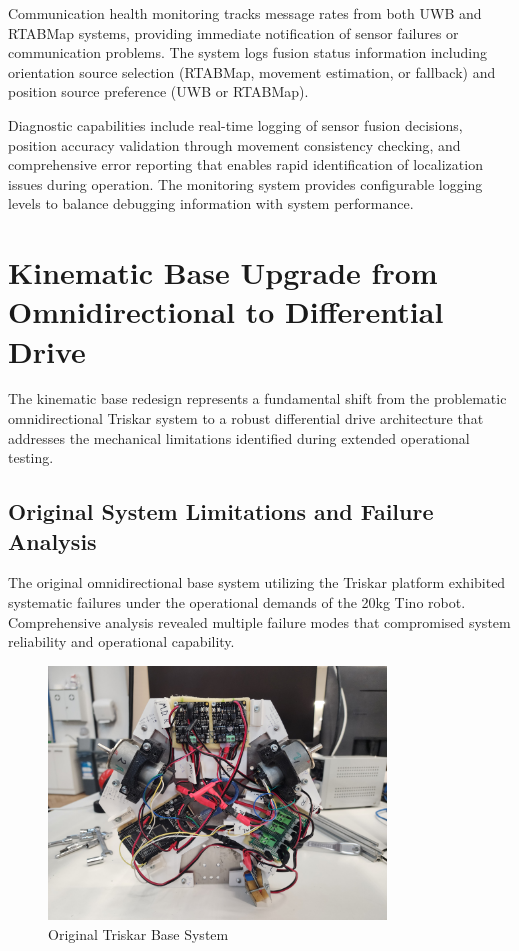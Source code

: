 Communication health monitoring tracks message rates from both UWB and RTABMap systems, providing immediate notification of sensor failures or communication problems. The system logs fusion status information including orientation source selection (RTABMap, movement estimation, or fallback) and position source preference (UWB or RTABMap).

Diagnostic capabilities include real-time logging of sensor fusion decisions, position accuracy validation through movement consistency checking, and comprehensive error reporting that enables rapid identification of localization issues during operation. The monitoring system provides configurable logging levels to balance debugging information with system performance.


\section{Kinematic Base Upgrade from Omnidirectional to Differential Drive}

The kinematic base redesign represents a fundamental shift from the problematic omnidirectional Triskar system to a robust differential drive architecture that addresses the mechanical limitations identified during extended operational testing.

\subsection{Original System Limitations and Failure Analysis}

The original omnidirectional base system utilizing the Triskar platform exhibited systematic failures under the operational demands of the 20kg Tino robot. Comprehensive analysis revealed multiple failure modes that compromised system reliability and operational capability.

\begin{figure}[H]
    \centering
    \includegraphics[width=0.8\textwidth]{Images/OriginalTriskarBase.jpg}
    \caption{Original Triskar Base System}
    \label{fig:original_Triskar_base}
\end{figure}

